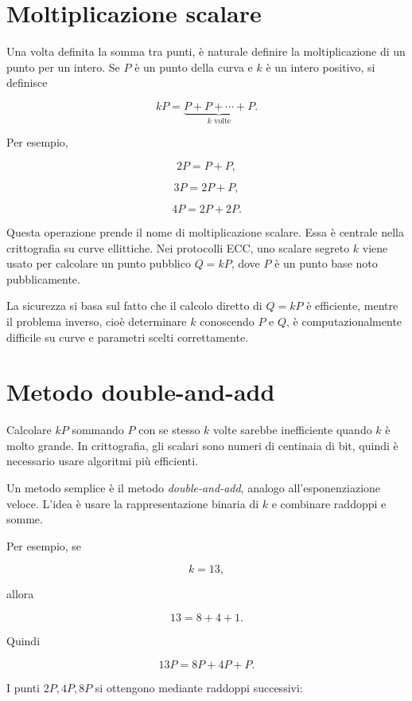 \documentclass[12pt,a4paper,oneside]{report}
\begin{document}
\section{Moltiplicazione scalare}

Una volta definita la somma tra punti, è naturale definire la moltiplicazione di un punto per un intero. Se \(P\) è un punto della curva e \(k\) è un intero positivo, si definisce

\begin{equation}
    kP = \underbrace{P+P+\cdots+P}_{k \text{ volte}}.
\end{equation}

Per esempio,

\[
2P=P+P,
\]

\[
3P=2P+P,
\]

\[
4P=2P+2P.
\]

Questa operazione prende il nome di moltiplicazione scalare. Essa è centrale nella crittografia su curve ellittiche. Nei protocolli ECC, uno scalare segreto \(k\) viene usato per calcolare un punto pubblico \(Q=kP\), dove \(P\) è un punto base noto pubblicamente.

La sicurezza si basa sul fatto che il calcolo diretto di \(Q=kP\) è efficiente, mentre il problema inverso, cioè determinare \(k\) conoscendo \(P\) e \(Q\), è computazionalmente difficile su curve e parametri scelti correttamente.

\section{Metodo double-and-add}

Calcolare \(kP\) sommando \(P\) con se stesso \(k\) volte sarebbe inefficiente quando \(k\) è molto grande. In crittografia, gli scalari sono numeri di centinaia di bit, quindi è necessario usare algoritmi più efficienti.

Un metodo semplice è il metodo \textit{double-and-add}, analogo all'esponenziazione veloce. L'idea è usare la rappresentazione binaria di \(k\) e combinare raddoppi e somme.

Per esempio, se

\[
k=13,
\]

allora

\[
13 = 8+4+1.
\]

Quindi

\[
13P = 8P+4P+P.
\]

I punti \(2P,4P,8P\) si ottengono mediante raddoppi successivi:
\end{document}
